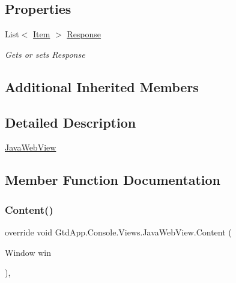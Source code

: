 \subsection*{Properties}
\begin{DoxyCompactItemize}
\item 
List$<$ \mbox{\hyperlink{class_gtd_app_1_1_data_1_1_item}{Item}} $>$ \mbox{\hyperlink{class_gtd_app_1_1_console_1_1_views_1_1_java_web_view_a5c8f9afd066cd29d616c51712eb2c6c1}{Response}}
\begin{DoxyCompactList}\small\item\em Gets or sets Response \end{DoxyCompactList}\end{DoxyCompactItemize}
\subsection*{Additional Inherited Members}


\subsection{Detailed Description}
\mbox{\hyperlink{class_gtd_app_1_1_console_1_1_views_1_1_java_web_view}{Java\+Web\+View}} 



\subsection{Member Function Documentation}
\mbox{\label{class_gtd_app_1_1_console_1_1_views_1_1_java_web_view_a1e6174598b11cfe2eac028138c9549a4}} 
\subsubsection{\texorpdfstring{Content()}{Content()}}
{\footnotesize\ttfamily override void Gtd\+App.\+Console.\+Views.\+Java\+Web\+View.\+Content (\begin{DoxyParamCaption}\item[{Window}]{win }\end{DoxyParamCaption})\hspace{0.3cm}{\ttfamily [protected]}, {\ttfamily [virtual]}}



